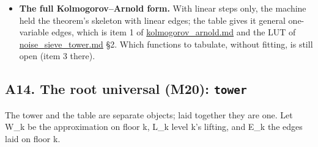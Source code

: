 \begin{itemize}
\begin{itemize}
\item \textbf{Proved} (\texttt{knf\_\allowbreak{}identity}, 23 checks, 0 failed): the knf of the nbody lattice (64³, 177 frames) against spatial null permutations. The host's walk equals the engine's knf at every voxel, and a single flipped bit leaves it unchanged exactly where the window rule says (1,500 of 8,192): the knf is many-to-one. The 48 exact cube motions carry the knf and keep its entangled entropy E and its cloud. The whole is its tiles plus its seams at every tile size. Alike-voxel controls are identified within 5σ of 1/20. \textbf{Measured:} E is 44.6 times the free null's mean, the inside and between departure curves cross between tiles of 2 and 4 and sum to 0.590 at 4, and each body's box has its own curve. Written in \hyperref[chap:two-crystals]{two\_\allowbreak{}crystals.md}.
\end{itemize}
\item \textbf{The full Kolmogorov–Arnold form.} With linear steps only, the machine held the theorem's skeleton with linear edges; the table gives it general one-variable edges, which is item 1 of \hyperref[chap:kolmogorov-arnold]{kolmogorov\_\allowbreak{}arnold.md} and the LUT of \hyperref[chap:noise-sieve-tower]{noise\_\allowbreak{}sieve\_\allowbreak{}tower.md} §2. Which functions to tabulate, without fitting, is still open (item 3 there).
\end{itemize}

\subsection{\texorpdfstring{A14. The root universal (M20): \texttt{tower}}{A14. The root universal (M20): tower}}

The tower and the table are separate objects; laid together they are one. Let W\_\allowbreak{}k be the approximation on floor k, L\_\allowbreak{}k level k's lifting, and E\_\allowbreak{}k the edges laid on floor k.

